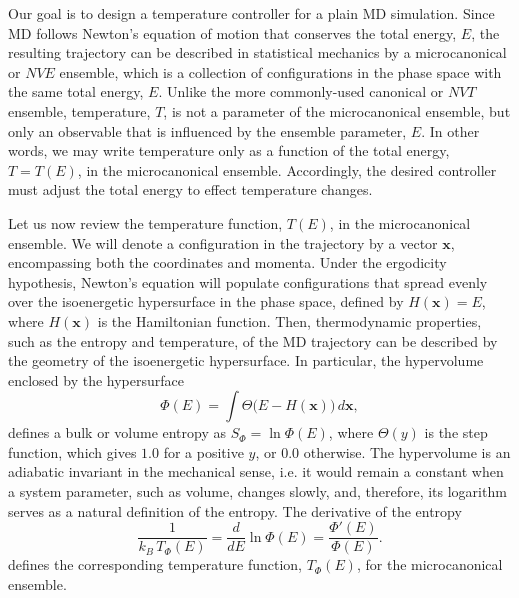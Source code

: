 \documentclass[reprint]{revtex4-1}
\begin{document}
Our goal is to design a temperature controller for a plain MD simulation.
%
Since MD follows Newton's equation of motion
that conserves the total energy, $E$,
the resulting trajectory can be described in statistical mechanics
by a microcanonical or $NVE$ ensemble,
which is a collection of configurations in the phase space
with the same total energy, $E$.
%
Unlike the more commonly-used canonical or $NVT$ ensemble,
temperature, $T$, is not a parameter of the microcanonical ensemble,
but only an observable
that is influenced by the ensemble parameter, $E$.
%
In other words,
we may write temperature
only as a function of the total energy, $T = T(E)$,
in the microcanonical ensemble.
%
Accordingly, the desired controller must adjust the total energy
to effect temperature changes.


Let us now review the temperature function, $T(E)$,
in the microcanonical ensemble.
%
We will denote a configuration in the trajectory
by a vector $\mathbf x$,
encompassing both the coordinates and momenta.
%
Under the ergodicity hypothesis,
Newton's equation will populate configurations
that spread evenly over
the isoenergetic hypersurface in the phase space,
defined by
$H(\mathbf x) = E$,
where $H(\mathbf x)$ is the Hamiltonian function.
%
Then, thermodynamic properties, such as the entropy and temperature,
of the MD trajectory
can be described by the geometry of the isoenergetic hypersurface.
%
In particular, the hypervolume enclosed by the hypersurface
%
\begin{equation}
  \Phi(E)
  =
  \int
    \Theta\bigl( E - H(\mathbf x) \bigr)
    \, d\mathbf x
  ,
  \label{eq:PhiE}
\end{equation}
%
defines a bulk or volume entropy\cite{
  cagin1988, haile, dunkel2014}
as $S_\Phi = \ln \Phi(E)$,
where $\Theta(y)$ is the step function,
which gives $1.0$ for a positive $y$, or $0.0$ otherwise.
%
The hypervolume is
an adiabatic invariant\cite{
  gibbs, hertz1910a, hertz1910b, munster, becker,
  cagin1988, rugh2001, adib2002, dunkel2014}
in the mechanical sense,
i.e. it would remain a constant
when a system parameter, such as volume,
changes slowly,
and, therefore, its logarithm serves as
a natural definition of the entropy.
%
The derivative of the entropy
%
\begin{equation}
  \frac{1}{ k_B \, T_\Phi(E) }
  =
  \frac{ d }{ dE }
  \ln \Phi(E)
  =
  \frac{ \Phi'(E) }
       { \Phi(E)  }
  .
  \label{eq:betaE_def}
\end{equation}
%
defines the corresponding temperature function, $T_\Phi(E)$,
for the microcanonical ensemble.
\end{document}
